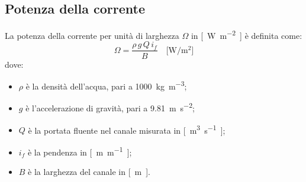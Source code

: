 \subsection{Potenza della corrente}
La potenza della corrente per unità di larghezza $\Omega$ in \si{[\watt\per\meter\tothe{2}]} è definita come:
%
\begin{equation}
	\label{eq:omega}
	\Omega = \frac{\rho \, g \, Q \, i_f}{B}
	\quad
	\si{[\watt\per\meter\tothe{2}]}
\end{equation}
%
dove:
%
\begin{itemize}
	\item $\rho$ è la densità dell'acqua, pari a \SI{1000}{\kilo\g\per\meter\tothe{3}};
	\item $g$ è l'accelerazione di gravità, pari a \SI{9.81}{\m\per\s\tothe{2}};
	\item $Q$ è la portata fluente nel canale misurata in \si{[\m\tothe{3}\per\s]};
	\item $i_f$ è la pendenza in \si{[\m\per\m]};
	\item $B$ è la larghezza del canale in \si{[\m]}.
\end{itemize}
%

